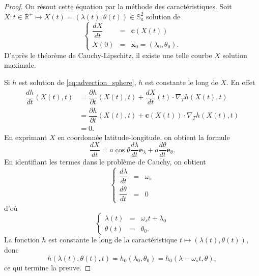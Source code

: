 \begin{proof}
On résout cette équation par la méthode des caractéristiques. Soit $X : t \in \mathbb{R}^+ \mapsto X(t)=(\lambda(t), \theta(t)) \in \mathbb{S}_a^2$ solution de 
\begin{equation}
\left\lbrace
\begin{array}{rcl}
\dfrac{dX}{dt} & = & \mathbf{c}(X(t)) \\
X(0) & = & \mathbf{x}_0 = (\lambda_0, \theta_0).
\end{array}
\right.
\label{eq:cauchy_sphere1}
\end{equation}
D'après le théorème de Cauchy-Lipschitz, il existe une telle courbe $X$ solution maximale.

Si $h$ est solution de \eqref{eq:advection_sphere}, $h$ est constante le long de $X$. En effet
\begin{align*}
\dfrac{dh}{dt}(X(t),t) & = \dfrac{\partial h}{\partial t} (X(t),t) + \dfrac{d X}{dt}(t) \cdot \nabla_T h(X(t),t) \\
& = \dfrac{\partial h}{\partial t} (X(t),t) + \mathbf{c}(X(t)) \cdot \nabla_T h(X(t),t) \\
& = 0.
\end{align*}
En exprimant $X$ en coordonnée latitude-longitude, on obtient la formule
\begin{equation}
\dfrac{dX}{dt} = a \cos \theta \dfrac{d \lambda}{dt} \mathbf{e}_{\lambda} + a \dfrac{d \theta}{d t} \mathbf{e}_{\theta}.
\end{equation}
En identifiant les termes dans le problème de Cauchy, on obtient
\begin{equation}
\left\lbrace
\begin{array}{rcl}
\dfrac{d \lambda}{d t} & = & \omega_s \\
\dfrac{d \theta}{d t}  & = & 0
\end{array}
\right.
\end{equation}
d'où
\begin{equation}
\left\lbrace
\begin{array}{rcl}
\lambda(t) & = & \omega_s t + \lambda_0 \\
\theta(t)  & = & \theta_0.
\end{array}
\right.
\end{equation}
La fonction $h$ est constante le long de la caractéristique $t \mapsto (\lambda(t), \theta(t))$, donc
\begin{equation}
h(\lambda(t), \theta(t), t) = h_0(\lambda_0 , \theta_0 ) = h_0(\lambda - \omega_s t, \theta ),
\end{equation}
ce qui termine la preuve.
\end{proof}

